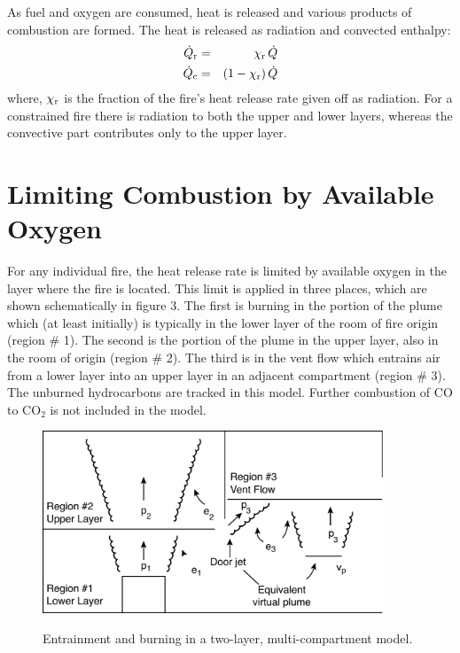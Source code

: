 As fuel and oxygen are consumed, heat is released and various products of combustion are formed. The heat is released as radiation and convected enthalpy:
\begin{eqnarray} 
   \dot{Q}_{\rm r} &=& \chi_{\rm r} \, \dot{Q} \\
   \dot{Q}_{\rm c} &=& (1-\chi_{\rm r}) \, \dot{Q}
\end{eqnarray}
where, $\chi_{\rm r}$ is the fraction  of the fire's heat release rate given off as radiation.    For a constrained fire there is radiation to both the upper and lower layers, whereas the convective part contributes only to the upper layer.

\section{Limiting Combustion by Available Oxygen \label{sec:Oxygen_Limit}}

For any individual fire, the heat release rate is limited by available oxygen in the layer where the fire is located. This limit is applied in three places, which are shown schematically in figure 3. The first is burning in the portion of the plume which (at least initially) is typically in the lower layer of the room of fire origin (region \# 1).  The second is the portion of the plume in the upper layer, also in the room of origin (region \# 2).  The third is in the vent flow which entrains air from a lower layer into an upper layer in an adjacent compartment (region \# 3). The unburned hydrocarbons are tracked in this model.  Further combustion of CO to $\mathrm{CO_2}$ is not included in the model.

\begin{figure}[h]
\begin{center}
\includegraphics[width=4.0in]{FIGURES/Theory/Fire_entrain}\\
\end{center}
\caption{Entrainment and burning in a two-layer, multi-compartment model.}
 \label{fig:Burning_Regions}
\end{figure}

